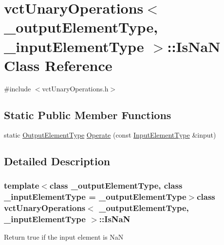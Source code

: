 \hypertarget{classvct_unary_operations_1_1_is_na_n}{\section{vct\-Unary\-Operations$<$ \-\_\-output\-Element\-Type, \-\_\-input\-Element\-Type $>$\-:\-:Is\-Na\-N Class Reference}
\label{classvct_unary_operations_1_1_is_na_n}
}


{\ttfamily \#include $<$vct\-Unary\-Operations.\-h$>$}

\subsection*{Static Public Member Functions}
\begin{DoxyCompactItemize}
\item 
static \hyperlink{classvct_unary_operations_a42306ac3dd20d32c6d6c66ac3fa2e7b9}{Output\-Element\-Type} \hyperlink{classvct_unary_operations_1_1_is_na_n_ac8092f9ed074f6770d7bc7bd5aead3dd}{Operate} (const \hyperlink{classvct_unary_operations_abf3b77bb7b8abd7ba72a6a45a65696a7}{Input\-Element\-Type} \&input)
\end{DoxyCompactItemize}


\subsection{Detailed Description}
\subsubsection*{template$<$class \-\_\-output\-Element\-Type, class \-\_\-input\-Element\-Type = \-\_\-output\-Element\-Type$>$class vct\-Unary\-Operations$<$ \-\_\-output\-Element\-Type, \-\_\-input\-Element\-Type $>$\-::\-Is\-Na\-N}

Return true if the input element is Na\-N 

